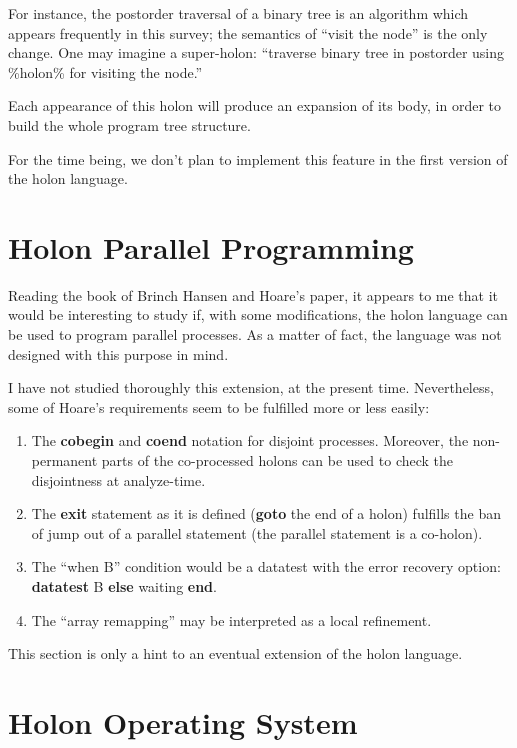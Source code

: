 \documentclass[openany,nobib]{tufte-book}
\newcommand{\kw}[1]{{\bf #1}}
\begin{document}
For instance, the postorder traversal of a binary tree is an algorithm which
appears frequently in this survey; the semantics of ``visit the node'' is the
only change. One may imagine a super-holon: ``traverse binary tree in postorder
using \%holon\% for visiting the node.''

Each appearance of this holon will produce an expansion of its body, in order
to build the whole program tree structure.

For the time being, we don't plan to implement this feature in the first
version of the holon language.

\chapter{Holon Parallel Programming}

Reading the book of Brinch Hansen\autocite{hansen1973operating} and Hoare's
paper,\autocite{hoare1972towards} it appears to me that it would be interesting
to study if, with some modifications, the holon language can be used to program
parallel processes. As a matter of fact, the language was not designed with
this purpose in mind.

I have not studied thoroughly this extension, at the present time.
Nevertheless, some of Hoare's requirements seem to be fulfilled more or less
easily:
\begin{enumerate}
    \item The \kw{cobegin} and \kw{coend} notation for disjoint processes.
Moreover, the non-permanent parts of the co-processed holons can be used to
check the disjointness at analyze-time.
    \item The \kw{exit} statement as it is defined (\kw{goto} the end of a
holon) fulfills the ban of jump out of a parallel statement (the parallel
statement is a co-holon).
    \item The ``when B'' condition would be a datatest with the error recovery
option: \kw{datatest} B \kw{else} waiting \kw{end}.
    \item The ``array remapping'' may be interpreted as a local refinement.
\end{enumerate}
This section is only a hint to an eventual extension of the holon language.

\chapter{Holon Operating System}
\end{document}

